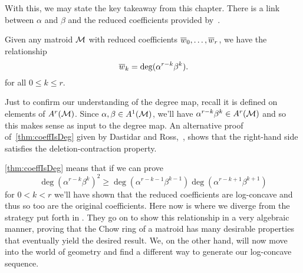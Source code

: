 \documentclass[12pt,oneside]{../../sfsuthesis}
\begin{document}
With this, we may state the key takeaway from this chapter.
There is a link between \( \alpha \) and \( \beta \) and the reduced coefficients provided by~\cite[Proposition~9.5]{adiprasitoHodgeTheoryCombinatorial2018}.
\begin{proposition}\th\label{thm:coeffIsDeg}
    Given any matroid \( \mathcal{M} \) with reduced coefficients \( \overline{w}_0, \dots, \overline{w}_r \), we have the relationship
    \[
        \overline{w}_k = \deg(\alpha^{r-k}\beta^k).
    \]
    for all \( 0 \leq k \leq r \).
\end{proposition}
Just to confirm our understanding of the degree map, recall it is defined on elements of \( A^r(\mathcal{M}) \).
Since \( \alpha, \beta \in A^1(\mathcal{M})\), we'll have \( \alpha^{r-k}\beta^k \in A^r(\mathcal{M}) \) and so this makes sense as input to the degree map.
An alternative proof of~\th\ref{thm:coeffIsDeg} given by Dastidar and Ross,~\cite[Proposition~3.11]{dastidarMatroidPsiClasses2021}, shows that the right-hand side satisfies the deletion-contraction property.

\th\ref{thm:coeffIsDeg} means that if we can prove
\[
    \deg(\alpha^{r-k}\beta^k)^2 \geq \deg(\alpha^{r-k-1}\beta^{k-1}) \deg(\alpha^{r-k+1}\beta^{k+1})
\]
for \( 0 < k < r \) we'll have shown that the reduced coefficients are log-concave and thus so too are the original coefficients.
Here now is where we diverge from the strategy put forth in \cite{adiprasitoHodgeTheoryCombinatorial2018}.
They go on to show this relationship in a very algebraic manner, proving that the Chow ring of a matroid has many desirable properties that eventually yield the desired result.
We, on the other hand, will now move into the world of geometry and find a different way to generate our log-concave sequence.
\end{document}
